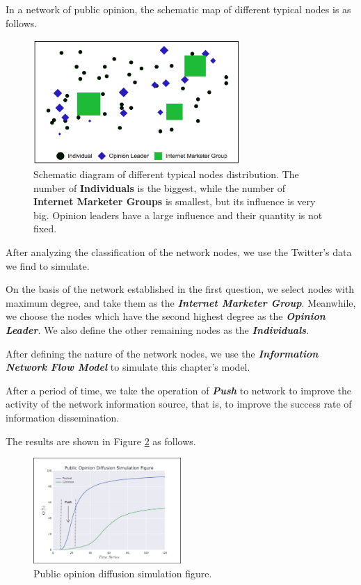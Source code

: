\documentclass[a4paper,11pt]{article}
\begin{document}
\par In a network of public opinion, the schematic map of different typical nodes is as follows.


\begin{figure}[h]%
    \centering 
    \includegraphics[width=0.7\textwidth]{./Pic/Unknown.png}
    \caption{Schematic diagram of different typical nodes distribution. The number of \textbf{Individuals} is the biggest, while the number of \textbf{Internet Marketer Groups} is smallest, but its influence is very big. Opinion leaders have a large influence and their quantity is not fixed.}
    \label{fig:Unknown}  
\end{figure}

\par After analyzing the classification of the network nodes, we use the Twitter's data we find to simulate.
\par On the basis of the network established in the first question, we select nodes with maximum degree, and take them as the \textbf{\emph{Internet Marketer Group}}. Meanwhile, we choose the nodes which have the second highest degree as the \textbf{\emph{Opinion Leader}}. We also define the other remaining nodes as the \textbf{\emph{Individuals}}.
\par After defining the nature of the network nodes, we use the \textbf{\emph{Information Network Flow Model}} to simulate this chapter's model.
\par After a period of time, we take the operation of \textbf{\emph{Push}} to network to improve the activity of the network information source, that is, to improve the success rate of information dissemination.
\par The results are shown in Figure \ref{fig:P4} as follows.


\begin{figure}[h]%
    \centering 
    \includegraphics[width=0.5\textwidth]{./Pic/P4.jpg}
    \caption{Public opinion diffusion simulation figure.}
    \label{fig:P4}  
\end{figure}
\end{document}
